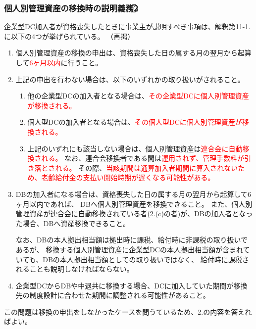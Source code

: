 \newpage

\subsubsection{個人別管理資産の移換時の説明義務\textcircled{2}}

\begin{itembox}[l]{}
  企業型DC加入者が資格喪失したときに事業主が説明すべき事項は、解釈第11-1.に以下の4つが挙げられている。
  （再掲）

  \begin{enumerate}
    \item 個人別管理資産の移換の申出は、資格喪失した日の属する月の翌月から起算して\textcolor{red}{6ヶ月以内}に行うこと。
    \item 上記の申出を行わない場合は、以下のいずれかの取り扱いがされること。
    \begin{enumerate}
      \item 他の企業型DCの加入者となる場合は、\textcolor{red}{その企業型DCに個人別管理資産が移換される。}
      \item 個人型DCの加入者となる場合は、\textcolor{red}{その個人型DCに個人別管理資産が移換される。}
      \item 上記のいずれにも該当しない場合は、個人別管理資産は\textcolor{red}{連合会に自動移換される。}
      なお、連合会移換者である間は\textcolor{red}{運用されず、管理手数料が引き落とされる。}
      その際、\textcolor{red}{当該期間は通算加入者期間に算入されないため、老齢給付金の支払い開始時期が遅くなる可能性がある。}
    \end{enumerate}
    \item DBの加入者になる場合は、資格喪失した日の属する月の翌月から起算して6ヶ月以内であれば、
      DBへ個人別管理資産を移換できること。
      また、個人別管理資産が連合会に自動移換されている者(2.(c)の者)が、DBの加入者となった場合、DBへ資産移換できること。

      なお、DBの本人拠出相当額は拠出時に課税、給付時に非課税の取り扱いであるが、
      移換する個人別管理資産に企業型DCの本人拠出相当額が含まれていても、DBの本人拠出相当額としての取り扱いではなく、
      給付時に課税されることも説明しなければならない。
    
    \item 企業型DCからDBや中退共に移換する場合、DCに加入していた期間が移換先の制度設計に合わせた期間に調整される可能性があること。
  \end{enumerate}

  この問題は移換の申出をしなかったケースを問うているため、2.の内容を答えればよい。

\end{itembox}

